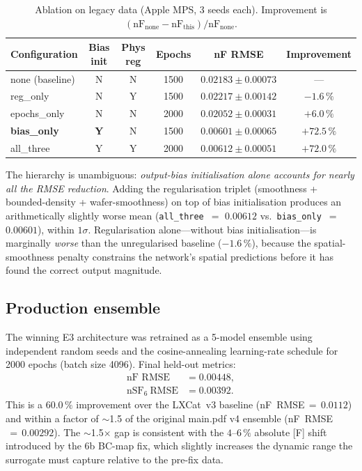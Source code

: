 \documentclass[11pt,a4paper]{article}
\begin{document}
\begin{table}[H]
  \centering
  \caption{Ablation on legacy data (Apple MPS, 3 seeds each).
           Improvement is $(\mathrm{nF}_\mathrm{none} -
           \mathrm{nF}_\mathrm{this})/\mathrm{nF}_\mathrm{none}$.}
  \label{tab:legacy-ablation}
  \small
  \begin{tabular}{l c c c c c}
    \toprule
    Configuration & Bias init & Phys reg & Epochs & nF RMSE & Improvement \\
    \midrule
    none (baseline) & N & N & 1500 & $0.02183 \pm 0.00073$ & --- \\
    reg\_only       & N & Y & 1500 & $0.02217 \pm 0.00142$ & $-1.6\,\%$ \\
    epochs\_only    & N & N & 2000 & $0.02052 \pm 0.00031$ & $+6.0\,\%$ \\
    \textbf{bias\_only} & \textbf{Y} & N & 1500 & $\mathbf{0.00601 \pm 0.00065}$ & $\mathbf{+72.5\,\%}$ \\
    all\_three      & Y & Y & 2000 & $0.00612 \pm 0.00051$ & $+72.0\,\%$ \\
    \bottomrule
  \end{tabular}
\end{table}

The hierarchy is unambiguous: \emph{output-bias initialisation alone
accounts for nearly all the RMSE reduction}.  Adding the
regularisation triplet (smoothness + bounded-density +
wafer-smoothness) on top of bias initialisation produces an
arithmetically slightly worse mean (\texttt{all\_three}~$=$ $0.00612$
vs.\ \texttt{bias\_only}~$=$ $0.00601$), within $1\sigma$.
Regularisation alone---without bias initialisation---is marginally
\emph{worse} than the unregularised baseline ($-1.6\,\%$), because the
spatial-smoothness penalty constrains the network's spatial
predictions before it has found the correct output magnitude.

\subsection{Production ensemble}
The winning E3 architecture was retrained as a 5-model ensemble using
independent random seeds and the cosine-annealing learning-rate
schedule for 2000 epochs (batch size 4096).  Final held-out metrics:
\begin{align}
  \text{nF RMSE}              &= 0.00448, \\
  \text{nSF}_6\ \text{RMSE}    &= 0.00392.
\end{align}
This is a $60.0\,\%$ improvement over the LXCat~v3 baseline
(nF~RMSE$\,=\,0.0112$) and within a factor of $\sim$1.5 of the
original main.pdf v4 ensemble (nF~RMSE$\,=\,0.00292$).  The
$\sim$1.5$\times$ gap is consistent with the $4$--$6\,\%$ absolute
[F] shift introduced by the 6b BC-map fix, which slightly increases
the dynamic range the surrogate must capture relative to the
pre-fix data.
\end{document}
